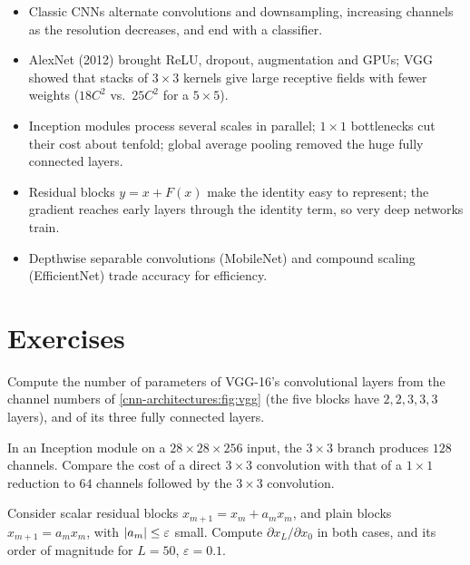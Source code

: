 \begin{notechapter}
\begin{chaptersummary}
\begin{itemize}[nosep]
  \item Classic CNNs alternate convolutions and downsampling, increasing channels as the
        resolution decreases, and end with a classifier.
  \item AlexNet (2012) brought ReLU, dropout, augmentation and GPUs; VGG showed that stacks
        of $3\times3$ kernels give large receptive fields with fewer weights ($18C^2$ vs.\ $25C^2$ for a $5\times5$).
  \item Inception modules process several scales in parallel; $1\times1$ bottlenecks cut their cost
        about tenfold; global average pooling removed the huge fully connected layers.
  \item Residual blocks $y = x + F(x)$ make the identity easy to represent; the gradient reaches early
        layers through the identity term, so very deep networks train.
  \item Depthwise separable convolutions (MobileNet) and compound scaling (EfficientNet) trade
        accuracy for efficiency.
\end{itemize}
\end{chaptersummary}

\section*{Exercises}

\begin{exercise}\label{cnn-architectures:exr:1}
Compute the number of parameters of VGG-16's convolutional layers from the channel
numbers of \cref{cnn-architectures:fig:vgg} (the five blocks have $2,2,3,3,3$ layers), and of its three
fully connected layers.
\end{exercise}

\begin{exercise}\label{cnn-architectures:exr:2}
In an Inception module on a $28\times28\times256$ input, the $3\times3$ branch produces $128$ channels. Compare the cost of a
direct $3\times3$ convolution with that of a $1\times1$ reduction to $64$ channels followed by the $3\times3$ convolution.
\end{exercise}

\begin{exercise}\label{cnn-architectures:exr:3}
Consider scalar residual blocks $x_{m+1} = x_m + a_mx_m$, and plain blocks $x_{m+1} = a_mx_m$, with $\left|a_m\right|\leq\varepsilon$ small.
Compute $\partial x_L/\partial x_0$ in both cases, and its order of magnitude for $L = 50$, $\varepsilon = 0.1$.
\end{exercise}


\end{notechapter}
